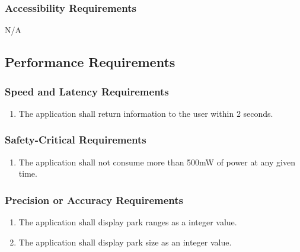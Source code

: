 \documentclass[titlepage]{article}
\newcounter{myCounter}
\begin{document}
\subsubsection{Accessibility Requirements}
\label{ssub:accessibility_requirements}
N/A


\subsection{Performance Requirements}
\label{sub:performance_requirements}
\setcounter{myCounter}{0}

\subsubsection{Speed and Latency Requirements}
\label{ssub:speed_and_latency_requirements}
\begin{enumerate}[{PR}1. ]
    \setcounter{enumi}{\themyCounter}
	\item The application shall return information to the user within 2 seconds.
    \setcounter{myCounter}{\theenumi}
\end{enumerate}

\subsubsection{Safety-Critical Requirements}
\label{ssub:safety_critical_requirements}
\begin{enumerate}[{PR}1. ]
    \setcounter{enumi}{\themyCounter}
	\item The application shall not consume more than 500mW of power at any given time.
    \setcounter{myCounter}{\theenumi}
\end{enumerate}

\subsubsection{Precision or Accuracy Requirements}
\label{ssub:precision_or_accuracy_requirements}
\begin{enumerate}[{PR}1. ]
    \setcounter{enumi}{\themyCounter}
	\item The application shall display park ranges as a integer value. 
	\item The application shall display park size as an integer value. 
	\setcounter{myCounter}{\theenumi}
\end{enumerate}
\end{document}
